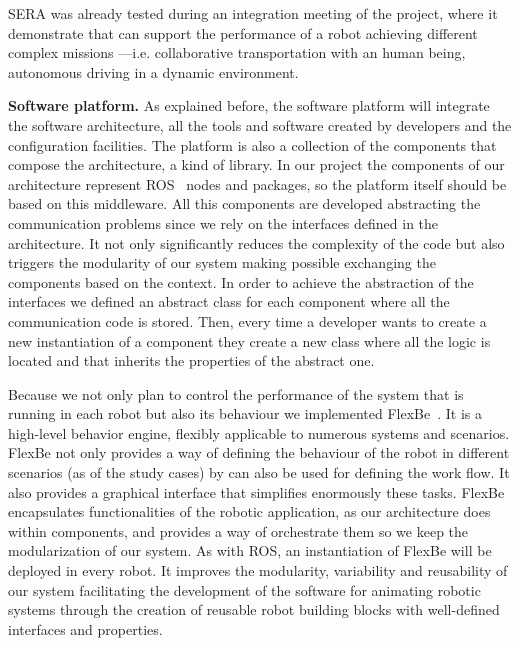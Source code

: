 SERA was already tested during an integration meeting of the project, where it demonstrate that can support the performance of a robot achieving different complex missions ---i.e. collaborative transportation with an human being, autonomous driving in a dynamic environment.


\textbf{Software platform.}
As explained before, the software platform will integrate the software architecture, all the tools and software created by developers and the configuration facilities.
The platform is also a collection of the components that compose the architecture, a kind of library.
In our project the components of our architecture represent ROS~\cite{Quigley2009} nodes and packages, so the platform itself should be based on this middleware.
All this components are developed abstracting the communication problems since we rely on the interfaces defined in the architecture.
It not only significantly reduces the complexity of the code but also triggers the modularity of our system making possible exchanging the components based on the context.
In order to achieve the abstraction of the interfaces we defined an abstract class for each component where all the communication code is stored.
Then, every time a developer wants to create a new instantiation of a component they create a new class where all the logic is located and that inherits the properties of the abstract one.

Because we not only plan to control the performance of the system that is running in each robot but also its behaviour we implemented FlexBe~\cite{Schillinger2016}.
It is a high-level behavior engine, flexibly applicable to numerous systems and scenarios.
FlexBe not only provides a way of defining the behaviour of the robot in different scenarios (as of the study cases) by can also be used for defining the work flow.
It also provides a graphical interface that simplifies enormously these tasks.
FlexBe encapsulates functionalities of the robotic application, as our architecture does within components, and provides a way of orchestrate them so we keep the modularization of our system.
As with ROS, an instantiation of FlexBe will be deployed in every robot.
It improves the modularity, variability and reusability of our system facilitating the development of the software for animating robotic systems through the creation of reusable robot building blocks with well-defined interfaces and properties.

